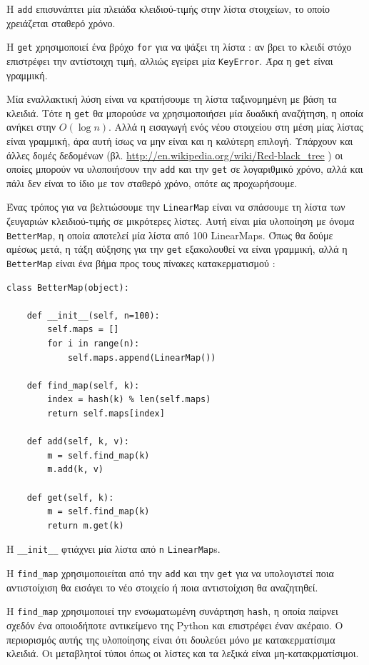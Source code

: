 \documentclass[10pt]{book}
\begin{document}
 Η  {\tt add}  επισυνάπτει μία πλειάδα κλειδιού-τιμής στην λίστα στοιχείων, το οποίο χρειάζεται σταθερό χρόνο.

Η  {\tt get}  χρησιμοποιεί ένα βρόχο  {\tt for}  για να ψάξει τη 
λίστα :  αν βρει το κλειδί στόχο επιστρέφει την αντίστοιχη τιμή, αλλιώς εγείρει μία  {\tt KeyError}.   Άρα η  {\tt get}  είναι γραμμική.

Μία εναλλακτική λύση είναι να κρατήσουμε τη λίστα ταξινομημένη με βάση τα κλειδιά.  
Τότε η {\tt get} θα μπορούσε να χρησιμοποιήσει μία δυαδική αναζήτηση, η οποία ανήκει στην $O(\log n)$.  Αλλά η εισαγωγή ενός νέου στοιχείου στη μέση μίας 
λίστας είναι γραμμική, άρα αυτή ίσως να μην είναι και η καλύτερη επιλογή.  Υπάρχουν και άλλες δομές δεδομένων (βλ. \url{http://en.wikipedia.org/wiki/Red-black_tree} ) οι οποίες μπορούν να υλοποιήσουν την  {\tt add}  και την  {\tt get}  σε λογαριθμικό χρόνο, αλλά και πάλι δεν είναι το ίδιο με τον σταθερό χρόνο, οπότε ας προχωρήσουμε.

Ένας τρόπος για να βελτιώσουμε την  {\tt LinearMap}  είναι να σπάσουμε τη λίστα των ζευγαριών κλειδιού-τιμής σε μικρότερες λίστες.  Αυτή είναι μία υλοποίηση με όνομα  {\tt BetterMap},  η οποία αποτελεί μία λίστα από 100  LinearMaps.   Όπως θα δούμε αμέσως μετά, η τάξη αύξησης για την  {\tt get}  εξακολουθεί να είναι γραμμική, αλλά η  {\tt BetterMap}  είναι ένα βήμα προς τους πίνακες κατακερματισμού :

\begin{verbatim}
class BetterMap(object):

    def __init__(self, n=100):
        self.maps = []
        for i in range(n):
            self.maps.append(LinearMap())

    def find_map(self, k):
        index = hash(k) % len(self.maps)
        return self.maps[index]

    def add(self, k, v):
        m = self.find_map(k)
        m.add(k, v)

    def get(self, k):
        m = self.find_map(k)
        return m.get(k)
\end{verbatim}

 Η  \verb"__init__"  φτιάχνει μία λίστα από  {\tt n} {\tt LinearMap}s.

 Η  \verb"find_map"  χρησιμοποιείται από την  {\tt add}  και την   {\tt get}  για να υπολογιστεί ποια αντιστοίχιση θα εισάγει το νέο στοιχείο ή ποια αντιστοίχιση θα αναζητηθεί.

Η  \verb"find_map"  χρησιμοποιεί την ενσωματωμένη συνάρτηση  {\tt hash},  η οποία παίρνει σχεδόν ένα οποιοδήποτε αντικείμενο της  Python  και επιστρέφει έναν ακέραιο.  Ο περιορισμός αυτής της υλοποίησης είναι ότι δουλεύει 
μόνο με κατακερματίσιμα κλειδιά.  Οι μεταβλητοί τύποι όπως οι λίστες και τα λεξικά είναι μη-κατακρματίσιμοι.
\end{document}

